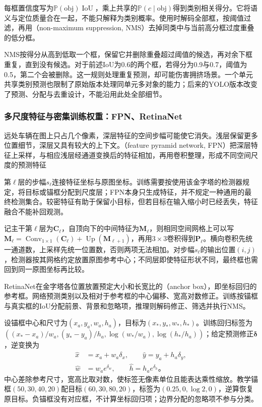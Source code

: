 每框置信度写为$\mathbb{P}(\mathrm{obj})\operatorname{IoU}$，乘上共享的$\mathbb{P}(c\mid\mathrm{obj})$得到类别相关得分。它将语义与定位质量合在一起，不能只解释为类别概率。使用时解码全部框，按阈值过滤，再用（non-maximum suppression, NMS）去掉同类中与当前高分框过度重叠的低分框。

NMS按得分从高到低取一个框，保留它并删除重叠超过阈值的候选，再对余下框重复，直到没有候选。对于前述IoU为0.6的两个框，若得分为0.9与0.7，阈值为0.5，第二个会被删除。这一规则处理重复预测，却可能伤害拥挤场景。一个单元共享类别预测也限制了原始版本处理同单元多对象的能力；后来的YOLO版本改变了预测、分配与去重设计，不能沿用此处全部细节。

\subsubsection{多尺度特征与密集训练权重：FPN、RetinaNet}
\label{sec:vision-recognition-fpn}

远处车辆在图上只占几个像素，深层特征的空间步幅可能使它消失。浅层保留更多位置细节，深层又具有较大的上下文。（feature pyramid network, FPN）把深层特征上采样，与相应浅层经通道变换后的特征相加，再用卷积整理，形成不同空间尺度的预测特征

第$\ell$层的步幅$s_\ell$连接特征坐标与原图坐标。训练需要按使用该金字塔的检测器规定，将目标或锚框分配到尺度层；FPN本身只生成特征，并不规定一种通用的最终检测集合。较密特征有助于保留小目标，但若目标在输入缩小时已经丢失，特征融合不能补回观测。

记主干第$\ell$层为$\bm{C}_\ell$，自顶向下的中间特征为$\bm{M}_\ell$，则相同空间网格上可以写$\bm{M}_\ell=\operatorname{Conv}_{1\times1}(\bm{C}_\ell)+\operatorname{Up}(\bm{M}_{\ell+1})$，再用$3\times3$卷积得到$\bm{P}_\ell$。横向卷积先统一通道数，上采样先统一位置数，否则两项无法相加。对步幅$s_\ell$的输出位置$(i,j)$，检测器按其网格约定放置原图参考中心；不同层即使特征形状不同，最终框也需回到同一原图坐标再比较。

RetinaNet在金字塔各位置放置预定大小和长宽比的（anchor box），即坐标回归的参考框。网络预测类别以及相对于参考框的中心偏移、宽高对数修正。训练按锚框与真实框的IoU分配前景、背景和忽略项，推理则解码修正、筛选并执行NMS。

设锚框中心和尺寸为$(x_a,y_a,w_a,h_a)$，目标为$(x_*,y_*,w_*,h_*)$。训练回归标签为$((x_*-x_a)/w_a,(y_*-y_a)/h_a,\log(w_*/w_a),\log(h_*/h_a))$；给定预测修正$\bm{\delta}$，逆变换为
\begin{equation}
 \begin{aligned}
 \hat x&=x_a+w_a\delta_x,\qquad \hat y=y_a+h_a\delta_y,\\
 \hat w&=w_a e^{\delta_w},\qquad \hat h=h_a e^{\delta_h}\text{。}
 \end{aligned}
 \label{eq:vision-retinanet-decode}
\end{equation}
中心差除参考尺寸，宽高比取对数，使标签无像素单位且能表达乘性缩放。教学锚框$(50,30,40,20)$配目标$(60,30,80,20)$，标签为$(0.25,0,\log2,0)$，逆算恢复原目标。负锚框没有对应框，不计算坐标回归项；边界分配的忽略项不参与分类。


